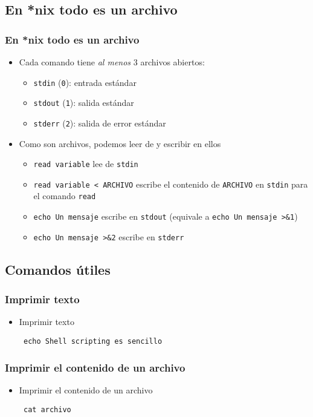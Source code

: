 \subsection{En *nix todo es un archivo}

\begin{frame}
  \frametitle{En *nix todo es un archivo}
  \begin{itemize}
    \item Cada comando tiene \textit{al menos} 3 archivos abiertos:
    \begin{itemize}
      \item \texttt{stdin} (\texttt{0}): entrada estándar
      \item \texttt{stdout} (\texttt{1}): salida estándar
      \item \texttt{stderr} (\texttt{2}): salida de error estándar
    \end{itemize}
    \item Como son archivos, podemos leer de y escribir en ellos
    \begin{itemize}
      \item \texttt{read variable} lee de \texttt{stdin}
      \item \texttt{read variable < ARCHIVO} escribe el contenido de \texttt{ARCHIVO} en \texttt{stdin}
        para el comando \texttt{read}
      \item \texttt{echo Un mensaje} escribe en \texttt{stdout} (equivale a \texttt{echo Un mensaje >\&1})
      \item \texttt{echo Un mensaje >\&2} escribe en \texttt{stderr}
    \end{itemize}
  \end{itemize}
\end{frame}

\subsection{Comandos útiles}

\begin{frame}[fragile]
  \frametitle{Imprimir texto}
  \begin{itemize}
    \item Imprimir texto
   \begin{lstlisting}
 echo Shell scripting es sencillo
   \end{lstlisting}
  \end{itemize}
\end{frame}

\begin{frame}[fragile]
  \frametitle{Imprimir el contenido de un archivo}
  \begin{itemize}
    \item Imprimir el contenido de un archivo
   \begin{lstlisting}
 cat archivo
   \end{lstlisting}
  \end{itemize}
\end{frame}

